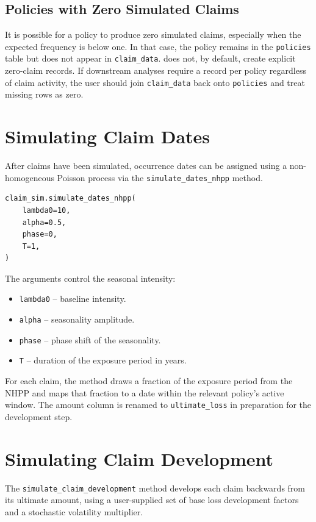 \subsection{Policies with Zero Simulated Claims}

It is possible for a policy to produce zero simulated claims, especially
when the expected frequency is below one. In that case, the policy
remains in the \texttt{policies} table but does not appear in
\texttt{claim\_data}. \actsim does not, by default, create explicit
zero-claim records. If downstream analyses require a record per policy
regardless of claim activity, the user should join \texttt{claim\_data}
back onto \texttt{policies} and treat missing rows as zero.

\section{Simulating Claim Dates}

After claims have been simulated, occurrence dates can be assigned using
a non-homogeneous Poisson process via the \texttt{simulate\_dates\_nhpp}
method.

\begin{lstlisting}[style=pythonstyle]
claim_sim.simulate_dates_nhpp(
    lambda0=10,
    alpha=0.5,
    phase=0,
    T=1,
)
\end{lstlisting}

The arguments control the seasonal intensity:
\begin{itemize}[leftmargin=*]
    \item \texttt{lambda0} -- baseline intensity.
    \item \texttt{alpha} -- seasonality amplitude.
    \item \texttt{phase} -- phase shift of the seasonality.
    \item \texttt{T} -- duration of the exposure period in years.
\end{itemize}

For each claim, the method draws a fraction of the exposure period from
the NHPP and maps that fraction to a date within the relevant policy's
active window. The amount column is renamed to \texttt{ultimate\_loss}
in preparation for the development step.

\section{Simulating Claim Development}

The \texttt{simulate\_claim\_development} method develops each claim
backwards from its ultimate amount, using a user-supplied set of base
loss development factors and a stochastic volatility multiplier.

